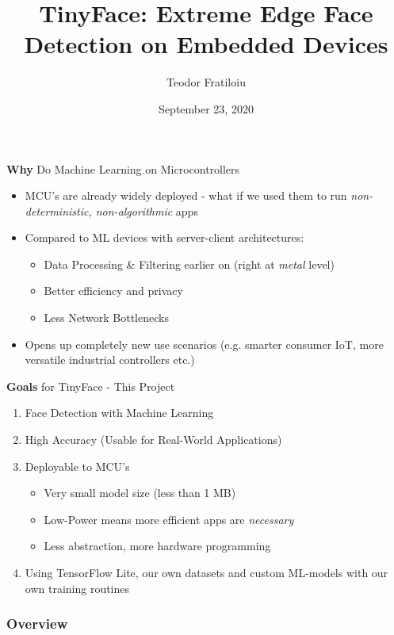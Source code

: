 \documentclass{beamer}
\title[Bachelor's Thesis Presentation]{TinyFace: Extreme Edge Face Detection on Embedded Devices} %
\author{Teodor Fratiloiu} %
\institute[Technical University of Munich] %
{
\medskip
}
\date{September 23, 2020} %
\begin{document}
\begin{frame}
\titlepage %
\end{frame}


\begin{frame}{\textbf{Why} Do Machine Learning on Microcontrollers}
    \begin{itemize}
        \item MCU's are already widely deployed - what if we used them to run \textit{non-deterministic, non-algorithmic} apps
        \item Compared to ML devices with server-client architectures:
        \begin{itemize}
        \item Data Processing \& Filtering earlier on (right at \textit{metal} level)
        \item Better efficiency and privacy
        \item Less Network Bottlenecks  
        \end{itemize}
        \item Opens up completely new use scenarios (e.g. smarter consumer IoT, more versatile industrial controllers etc.)
    \end{itemize}
\end{frame}
\begin{frame}{\textbf{Goals} for TinyFace - This Project}
\begin{enumerate}
    \item Face Detection with Machine Learning
    \item High Accuracy (Usable for Real-World Applications)
    \item Deployable to MCU's \cite{tinyml_book}
    \begin{itemize}
        \item Very small model size (less than 1 MB)
        \item Low-Power means more efficient apps are \textit{necessary}
        \item Less abstraction, more hardware programming
    \end{itemize}
    \item Using TensorFlow Lite, our own datasets and custom ML-models with our own training routines
\end{enumerate}
\end{frame}

\begin{frame}
\frametitle{Overview}
\tableofcontents
\end{frame}
\end{document}
